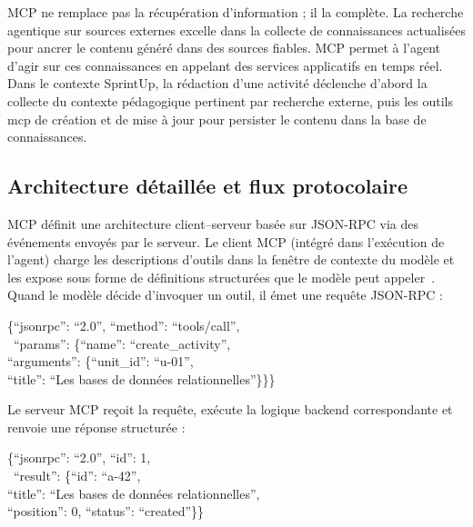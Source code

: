 MCP ne remplace pas la récupération d'information ; il la complète. La recherche
agentique sur sources externes excelle dans la collecte de connaissances
actualisées pour ancrer le contenu généré dans des sources fiables. MCP permet à
l'agent d'agir sur ces connaissances en appelant des services applicatifs en temps réel.
Dans le contexte SprintUp, la rédaction d'une activité déclenche d'abord la
collecte du contexte pédagogique pertinent par recherche externe, puis les
outils \gls{mcp} de création et de mise à jour pour persister le contenu dans
la base de connaissances.

\subsection{Architecture détaillée et flux protocolaire}

MCP définit une architecture client--serveur basée sur JSON-RPC via des événements
envoyés par le serveur. Le client MCP (intégré dans l'exécution de l'agent) charge les
descriptions d'outils dans la fenêtre de contexte du modèle et les expose sous forme
de définitions structurées que le modèle peut appeler~\cite{anthropicmcpdocs,mcpspec}.
Quand le modèle décide d'invoquer un outil, il émet une requête JSON-RPC :

\begin{tcolorbox}[colback=gray!5, colframe=gray!50, arc=3pt,
    title={\small Exemple de requ\^{e}te JSON-RPC MCP}]
\small\ttfamily
\{``jsonrpc'': ``2.0'', ``method'': ``tools/call'',\\
\ ``params'': \{``name'': ``create\_activity'',\\
\quad``arguments'': \{``unit\_id'': ``u-01'',\\
\qquad``title'': ``Les bases de données relationnelles''\}\}\}
\end{tcolorbox}

Le serveur MCP reçoit la requête, exécute la logique backend correspondante
et renvoie une réponse structurée :

\begin{tcolorbox}[colback=gray!5, colframe=gray!50, arc=3pt,
    title={\small Exemple de r\'{e}ponse JSON-RPC MCP}]
\small\ttfamily
\{``jsonrpc'': ``2.0'', ``id'': 1,\\
\ ``result'': \{``id'': ``a-42'',\\
\quad``title'': ``Les bases de données relationnelles'',\\
\quad``position'': 0, ``status'': ``created''\}\}
\end{tcolorbox}

